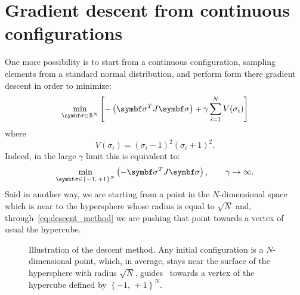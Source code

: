 \documentclass[\rootdir/main.tex]{subfiles}
\begin{document}
\section{Gradient descent from continuous configurations}
One more possibility is to start from a continuous configuration, \eg sampling elements from a standard normal distribution, and perform form there gradient descent in order to minimize:
\begin{equation}\label{eq:descent_method}
    \min_{\bsigma \in \mathbb{R}^N} \left[ - \left(\bsigma^T  J  \bsigma\right) + \gamma \sum_{i = 1}^{N} V(\sigma_i) \right]
\end{equation} 
where
\begin{equation}
    V(\sigma_i) = \left(\sigma_i - 1\right)^2 \left(\sigma_i + 1\right)^2. 
\end{equation}
Indeed, in the large $\gamma$ limit this is equivalent to:
\begin{equation}
    \min_{\bsigma \in \left\{-1, \, +1\right\}^N}  \left( - \bsigma^T J  \bsigma\right), \qquad \gamma \to \infty.
\end{equation}
Said in another way, we are starting from a point in the $N$-dimensional space which is near to the hypersphere whose radius is equal to $\sqrt{N}$ and, through~\cref{eq:descent_method} we are pushing that point towards a vertex of usual the hypercube.
\begin{figure}[hbt]
    \centering
    
    \caption{Illustration of the descent method. Any initial configuration \bsigma is a $N$-dimensional point, which, in average, stays near the surface of the hypersphere with radius $\sqrt{N}$.  guides \bsigma\ towards a vertex of the hypercube defined by $\left\{-1,\, + 1\right\}^N$.}
    \label{fig:descent_method}
\end{figure}
\end{document}
